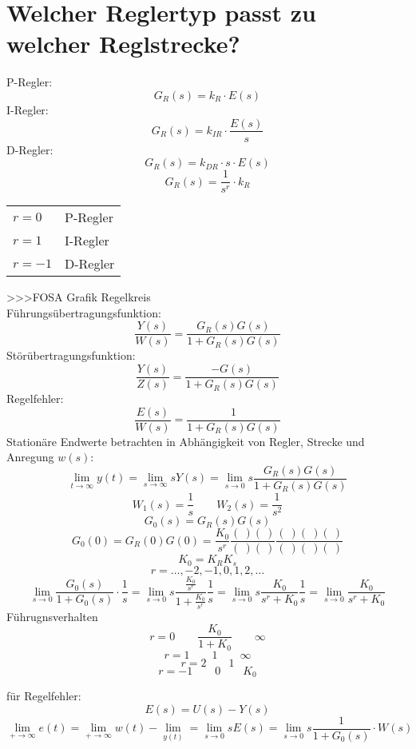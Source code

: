 \section{Welcher Reglertyp passt zu welcher Reglstrecke?}
P-Regler: 
\[ G_R(s) = k_R \cdot E(s) \]
I-Regler: 
\[ G_R(s) = k_{IR} \cdot \frac{E(s)}{s} \]
D-Regler: 
\[ G_R(s) = k_{DR} \cdot s \cdot E(s) \]
\[  G_R(s) = \frac{1}{s^r} \cdot k_R\]
\begin{tabular}{ll}
$r =  0$ & P-Regler \\
$r =  1$ & I-Regler \\
$r = -1$ & D-Regler \\
\end{tabular}
>>>FOSA Grafik Regelkreis\\
Führungsübertragungsfunktion: 
\[ \frac{Y(s)}{W(s)} = \frac{G_R(s) G(s)}{1 + G_R(s) G(s)} \]
Störübertragungsfunktion: 
\[ \frac{Y(s)}{Z(s)} = \frac{-G(s)}{1 + G_R(s) G(s)} \]
Regelfehler: 
\[ \frac{E(s)}{W(s)} = \frac{1}{1 + G_R(s) G(s)} \]
Stationäre Endwerte betrachten in Abhängigkeit von Regler, Strecke und 
Anregung $w(s)$: 
\[ \lim\limits_{t\to \infty} y(t) = \lim\limits_{s \to \infty} s Y(s) 
= \lim\limits_{s \to 0} s \frac{G_R(s) G(s)}{1 + G_R(s) G(s)} \]
\[ W_1(s) = \frac{1}{s} \qquad W_2(s) = \frac{1}{s^2} \]
\[ G_0(s) = G_R(s) G(s) \]
\[ G_0(0) = G_R(0) G(0) = \frac{K_0}{s^r} \frac{(~)(~)}{(~)(~)} 
\frac{(~)(~)(~)}{(~)(~)(~)} \]
\[ K_0 = K_R K_s \]
\[ r = \ldots, -2, -1, 0, 1, 2, \ldots \]
\[ \lim\limits_{s \to 0} \frac{G_0(s)}{1 + G_0(s)} \cdot \frac{1}{s} 
= \lim\limits_{s \to 0} s \frac{\frac{K_0}{s^r}}{1 + \frac{K_0}{s^r}} \frac{1}{s} 
= \lim\limits_{s \to 0} s \frac{K_0}{s^r + K_0} \frac{1}{s} 
= \lim\limits_{s \to 0} \frac{K_0}{s^r + K_0} \]
Führugnsverhalten
\[ r = 0 \qquad \frac{K_0}{1 + K_0} \qquad \infty \]
\[ r = 1 \qquad 1 \qquad \infty \]
\[ r = 2 \qquad 1 \]
\[ r = -1 \qquad 0 \qquad K_0 \]

für Regelfehler: 
\[ E(s) = U(s) - Y(s) \]
\[ \lim\limits_{+ \to \infty} e(t) = \lim\limits_{+ \to \infty} w(t) 
- \lim\limits_{y(t)} = \lim\limits_{s \to 0} s E(s) = \lim\limits_{s \to 0} s \frac{1}{1 + G_0(s)} \cdot W(s) \]

